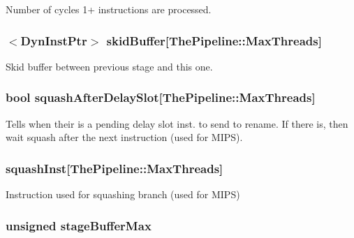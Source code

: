 \label{classPipelineStage_af9addd340a133c2f4add363a3055b019}
Number of cycles 1+ instructions are processed. \hypertarget{classPipelineStage_ad02ffed1611064a60befad18c5d428ef}{
\subsubsection[{skidBuffer}]{$<${\bf DynInstPtr}$>$ {\bf skidBuffer}\mbox{[}{\bf ThePipeline::MaxThreads}\mbox{]}}}
\label{classPipelineStage_ad02ffed1611064a60befad18c5d428ef}
Skid buffer between previous stage and this one. \hypertarget{classPipelineStage_ac364a786221f4a1741023dc82bc834f9}{
\subsubsection[{squashAfterDelaySlot}]{\setlength{\rightskip}{0pt plus 5cm}bool {\bf squashAfterDelaySlot}\mbox{[}{\bf ThePipeline::MaxThreads}\mbox{]}}}
\label{classPipelineStage_ac364a786221f4a1741023dc82bc834f9}
Tells when their is a pending delay slot inst. to send to rename. If there is, then wait squash after the next instruction (used for MIPS). \hypertarget{classPipelineStage_a2313a835690e0d98e53b1aa69754bb1f}{
\subsubsection[{squashInst}]{ {\bf squashInst}\mbox{[}{\bf ThePipeline::MaxThreads}\mbox{]}}}
\label{classPipelineStage_a2313a835690e0d98e53b1aa69754bb1f}
Instruction used for squashing branch (used for MIPS) \hypertarget{classPipelineStage_a8b3bf50b9e561c023857979eaf326bee}{
\subsubsection[{stageBufferMax}]{\setlength{\rightskip}{0pt plus 5cm}unsigned {\bf stageBufferMax}}}
